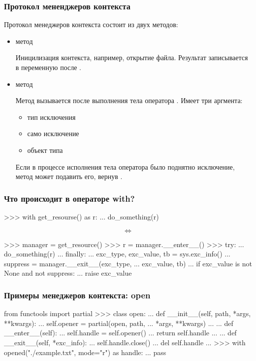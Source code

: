 \documentclass[fleqn, xcolor=x11names]{beamer}
\begin{document}
\begin{frame}[fragile]\frametitle{Протокол мененджеров контекста}
Протокол менеджеров контекста состоит из двух методов:
\begin{itemize}
    \item метод  
    
    Иницилизация контекста, например, открытие файла. Результат записывается в переменную после .
    
    \item метод 
    
    Метод вызывается после выполнения тела оператора . Имеет три аргмента:
    \begin{itemize}
        \item тип исключения
        \item само исключение
        \item объект типа 
    \end{itemize}

    Если в процессе исполнения тела оператора  было поднятно исключение, метод  может подавить его, вернув .
\end{itemize}
\end{frame}

\begin{frame}[fragile]\frametitle{Что происходит в операторе with?}
\begin{pcode}
>>> with get_resourse() as r:
...     do_something(r)
\end{pcode}
\huge{$${\Leftrightarrow}$$}
\begin{pcode}
>>> manager = get_resource()
>>> r = manager.__enter__()
>>> try:
...     do_something(r)
... finally:
...     exc_type, exc_value, tb = sys.exc_info()
...     suppress = manager.__exit__(exc_type,
...                                 exc_value, tb)
...     if exc_value is not None and not suppress:
...         raise exc_value
\end{pcode}
\end{frame}

\begin{frame}[fragile]\frametitle{Примеры менеджеров контекста: open}
\begin{pcode}
from functools import partial
>>> class open:
...     def __init__(self, path, *args, **kwargs):
...         self.opener = partial(open, path,
...                               *args, **kwargs)
...
...     def __enter__(self):
...         self.handle = self.opener()
...         return self.handle
...
...     def __exit__(self, *exc_info):
...         self.handle.close()
...         del self.handle
...
>>> with opened("./example.txt", mode="r") as handle:
...     pass
\end{pcode}
\end{frame}
\end{document}
